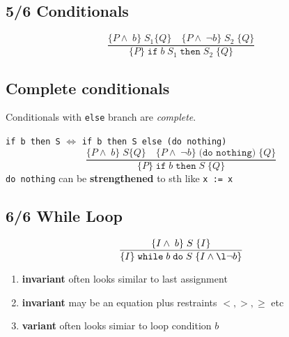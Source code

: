 {\subsection*{5/6 Conditionals}
\begin{displaymath}
  \frac{\{P \land\; b\}\;S_{1}\{Q\} \quad \{P \land \;\neg b\}\;S_{2}\;\{Q\}}{\{P\}\;\texttt{if}\;b\;S_{1}\;\texttt{then}\;S_{2}\;\{Q\}}
\end{displaymath}
%

\subsection*{Complete conditionals}
Conditionals with \texttt{else} branch are \emph{complete}.

\texttt{if b then S} $\Longleftrightarrow$ \texttt{if b then S else (do nothing)}
\begin{displaymath}
  \frac{\{P \land\; b\}\;S\{Q\} \quad \{P \land \;\neg b\}\;\texttt{(do nothing)}\;\{Q\}}{\{P\}\;\texttt{if}\;b\;\texttt{then}\;S\;\{Q\}}
\end{displaymath}
\texttt{do nothing} can be \textbf{strengthened} to sth like \verb|x := x|

\subsection*{6/6 While Loop}
\begin{displaymath}
  \frac{\{I \land\; b\}\;S\;\{I\}}{\{I\}\;\texttt{while}\;b\;\texttt{do}\;S\;\{I \land\l \neg b\}}
\end{displaymath}
\begin{enumerate}
\item \textbf{invariant} often looks similar to last assignment
\item \textbf{invariant} may be an equation plus restraints $<,>,\geq$ etc
\item \textbf{variant} often looks simiar to loop condition $b$
\end{enumerate}
}
